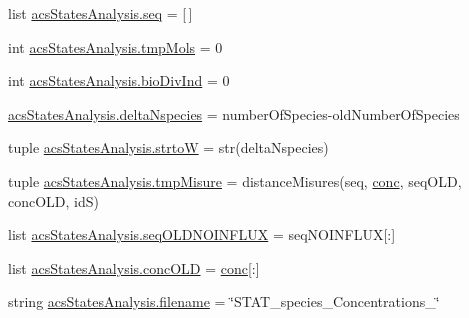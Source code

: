\begin{DoxyCompactItemize}
\item 
list \hyperlink{a00130_a22eec19fcd0da474a136cfe97438ae3b}{acs\-States\-Analysis.\-seq} = \mbox{[}$\,$\mbox{]}
\item 
int \hyperlink{a00130_aa24f8efad70335a8460f68902001ce64}{acs\-States\-Analysis.\-tmp\-Mols} = 0
\item 
int \hyperlink{a00130_a247328d05f06695b0c2de9a001ca4548}{acs\-States\-Analysis.\-bio\-Div\-Ind} = 0
\item 
\hyperlink{a00130_a555117703c3245ec7d3d73f5d991c8c5}{acs\-States\-Analysis.\-delta\-Nspecies} = number\-Of\-Species-\/old\-Number\-Of\-Species
\item 
tuple \hyperlink{a00130_abe05028c33fab522e3b940195eaaa586}{acs\-States\-Analysis.\-strto\-W} = str(delta\-Nspecies)
\item 
tuple \hyperlink{a00130_a45529ce20ca353ca8ac251b4e88c91ff}{acs\-States\-Analysis.\-tmp\-Misure} = distance\-Misures(seq, \hyperlink{a00027_a941dee33725f074478fdcbf15e1c35ae}{conc}, seq\-O\-L\-D, conc\-O\-L\-D, id\-S)
\item 
list \hyperlink{a00130_ac796dfff897c2b81d04e71e4f3306d16}{acs\-States\-Analysis.\-seq\-O\-L\-D\-N\-O\-I\-N\-F\-L\-U\-X} = seq\-N\-O\-I\-N\-F\-L\-U\-X\mbox{[}\-:\mbox{]}
\item 
list \hyperlink{a00130_a15f99c617a2dc95e52f741ee99e71b7a}{acs\-States\-Analysis.\-conc\-O\-L\-D} = \hyperlink{a00027_a941dee33725f074478fdcbf15e1c35ae}{conc}\mbox{[}\-:\mbox{]}
\item 
string \hyperlink{a00130_a69b59a10e5dc62a6e0d5325e9a27e5c6}{acs\-States\-Analysis.\-filename} = \char`\"{}S\-T\-A\-T\-\_\-species\-\_\-\-Concentrations\-\_\-\char`\"{}
\end{DoxyCompactItemize}
